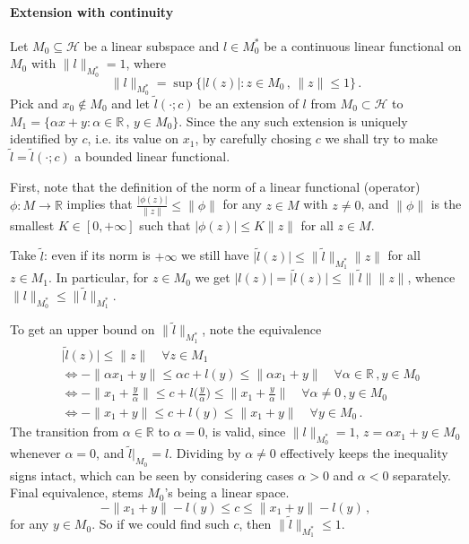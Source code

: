 \documentclass[a4paper]{article}
\newcommand{\Hcal}{\mathcal{H}}
\newcommand{\real}{\mathbb{R}}
\begin{document}

\paragraph{Extension with continuity} %
\label{par:extension_with_continuity}

Let $M_0 \subseteq \Hcal$ be a linear subspace and $l \in M_0^*$ be a continuous
linear functional on $M_0$ with $\|l\|_{M_0^*} = 1$, where
\begin{equation*}
  \|l\|_{M_0^*}
    = \sup\bigl\{\lvert l(z) \rvert\colon
        z\in M_0\,,
        \,\|z\|\leq 1
      \bigr\}
    \,.
\end{equation*}
Pick and $x_0\notin M_0$ and let $\tilde{l}(\cdot; c)$ be an extension of $l$ from
$M_0\subset \Hcal$ to $M_1 = \{\alpha x + y \colon \alpha \in \real\,,\, y \in M_0\}$.
Since the any such extension is uniquely identified by $c$, i.e. its value on $x_1$,
by carefully chosing $c$ we shall try to make $\tilde{l} = \tilde{l}(\cdot; c)$ a
bounded linear functional.

First, note that the definition of the norm of a linear functional (operator) $\phi
\colon M\to \real$ implies that $\tfrac{\lvert \phi(z) \rvert}{\|z\|} \leq \|\phi\|$
for any $z\in M$ with $z \neq 0$, and $\|\phi\|$ is the smallest $K\in [0, +\infty]$
such that $\lvert \phi(z) \rvert \leq K \|z\|$ for all $z\in M$.

Take $\tilde{l}$: even if its norm is $+\infty$ we still have $\lvert \tilde{l}(z)\rvert
\leq \|\tilde{l}\|_{M_1^*} \|z\|$ for all $z\in M_1$. In particular, for $z\in M_0$
we get $\lvert l(z)\rvert = \lvert \tilde{l}(z)\rvert \leq \|\tilde{l}\| \|z\|$,
whence $\|l\|_{M_0^*} \leq \|\tilde{l}\|_{M_1^*}$.

To get an upper bound on $\|\tilde{l}\|_{M_1^*}$, note the equivalence
\begin{align*}
  &\lvert \tilde{l}(z) \rvert \leq \|z\|
      \quad \forall z \in M_1
  \\ &\Leftrightarrow
    - \|\alpha x_1 + y\|
      \leq \alpha c + l(y)
      \leq \|\alpha x_1 + y\|
      \quad \forall \alpha \in \real\,, y \in M_0
  \\ &\Leftrightarrow
    - \bigl\|x_1 + \tfrac{y}\alpha\bigr\|
      \leq c + l\bigl(\tfrac{y}\alpha\bigr) \leq
        \bigl\|x_1 + \tfrac{y}\alpha\bigr\|
      \quad \forall \alpha \neq 0\,, y \in M_0
  \\ &\Leftrightarrow
    - \|x_1 + y\| \leq c + l(y) \leq \|x_1 + y\|
      \quad \forall y \in M_0
    \,.
\end{align*}
The transition from $\alpha \in \real$ to $\alpha = 0$, is valid, since $\|l\|_{M_0^*}
= 1$, $z = \alpha x_1 + y \in M_0$ whenever $\alpha = 0$, and $\tilde{l}\big\vert_{M_0}
= l$. Dividing by $\alpha \neq 0$ effectively keeps the inequality signs intact, which
can be seen by considering cases $\alpha > 0$ and $\alpha < 0$ separately. Final
equivalence, stems $M_0$'s being a linear space.
\begin{equation*}
  - \|x_1 + y\| - l(y) \leq c \leq \|x_1 + y\| - l(y)
    \,,
\end{equation*}
for any $y \in M_0$. So if we could find such $c$, then $\|\tilde{l}\|_{M_1^*} \leq 1$.
\end{document}
